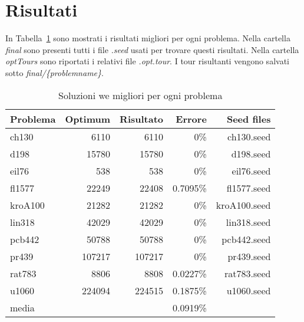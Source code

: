 \chapter*{Risultati}
\label{cha_risultati}

In Tabella~\ref{tab_migliori} sono mostrati i risultati migliori per ogni problema. 
Nella cartella \emph{final} sono presenti tutti i file \emph{.seed} usati per trovare
questi risultati. Nella cartella \emph{optTours} sono riportati i relativi file \emph{.opt.tour}.
I tour risultanti vengono salvati sotto \emph{final/\{problemname\}}.
\begin{table}[htb]
  \caption{Soluzioni we migliori per ogni problema}
  \label{tab_migliori}
  \centering
\begin{tabular}{lrrrr}
  \toprule
  Problema		&	Optimum		&	Risultato	&	Errore		&	Seed files		\\
  \midrule
  ch130			&	6110		&	6110		&	0\%	&	ch130.seed	\\
  d198			&	15780		&	15780		&	0\%	&	d198.seed	\\
  eil76			&	538		&	538		&	0\%	&	eil76.seed	\\
  fl1577		&	22249		&	22408		&	0.7095\%	&	fl1577.seed	\\
  kroA100		&	21282		&	21282		&	0\%	&	kroA100.seed	\\
  lin318		&	42029		&	42029		&	0\%	&	lin318.seed	\\
  pcb442		&	50788		&	50788		&	0\%	&	pcb442.seed	\\
  pr439			&	107217		&	107217		&	0\%	&	pr439.seed	\\
  rat783		&	8806		&	8808		&	0.0227\%	&	rat783.seed	\\
  u1060			&	224094		&	224515		&	0.1875\%	&	u1060.seed	\\
  \midrule
  media			&			&			&	0.0919\% 	&			\\
  \bottomrule
\end{tabular}
\end{table}
